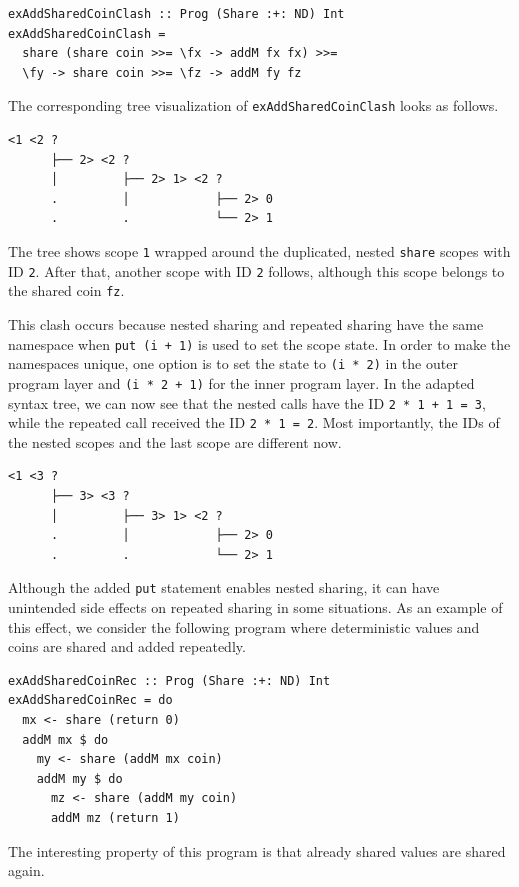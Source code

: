 \documentclass[a4paper, 11pt, fleqn, twoside, abstract=on]{scrreprt}
\newcommand{\hinl}[1]{\texttt{#1}}
\newcommand{\cinl}[1]{\texttt{#1}}
\begin{document}
\begin{verbatim}
exAddSharedCoinClash :: Prog (Share :+: ND) Int
exAddSharedCoinClash =
  share (share coin >>= \fx -> addM fx fx) >>=
  \fy -> share coin >>= \fz -> addM fy fz
\end{verbatim}
\noindent
The corresponding tree visualization of \cinl{exAddSharedCoinClash} looks as follows.
\pagebreak
\begin{verbatim}
<1 <2 ? 
      ├── 2> <2 ? 
      │         ├── 2> 1> <2 ?
      .         │            ├── 2> 0
      .         .            └── 2> 1
\end{verbatim}
\noindent
The tree shows scope \hinl{1} wrapped around the duplicated, nested \hinl{share} scopes with ID \hinl{2}.
After that, another scope with ID \hinl{2} follows, although this scope belongs to the shared coin \hinl{fz}.

This clash occurs because nested sharing and repeated sharing have the same namespace when \hinl{put (i + 1)} is used to set the scope state.
In order to make the namespaces unique, one option is to set the state to \hinl{(i * 2)} in the outer program layer and \hinl{(i * 2 + 1)} for the inner program layer.
In the adapted syntax tree, we can now see that the nested calls have the ID \hinl{2 * 1 + 1 = 3}, while the repeated call received the ID \hinl{2 * 1 = 2}.
Most importantly, the IDs of the nested scopes and the last scope are different now.

\begin{verbatim}
<1 <3 ? 
      ├── 3> <3 ? 
      │         ├── 3> 1> <2 ? 
      .         │            ├── 2> 0
      .         .            └── 2> 1

\end{verbatim}

Although the added \hinl{put} statement enables nested sharing, it can have unintended side effects on repeated sharing in some situations.
As an example of this effect, we consider the following program where deterministic values and coins are shared and added repeatedly.

\begin{verbatim}
exAddSharedCoinRec :: Prog (Share :+: ND) Int
exAddSharedCoinRec = do
  mx <- share (return 0)
  addM mx $ do
    my <- share (addM mx coin)
    addM my $ do
      mz <- share (addM my coin)
      addM mz (return 1)
\end{verbatim}
\noindent
The interesting property of this program is that already shared values are shared again.
\end{document}
